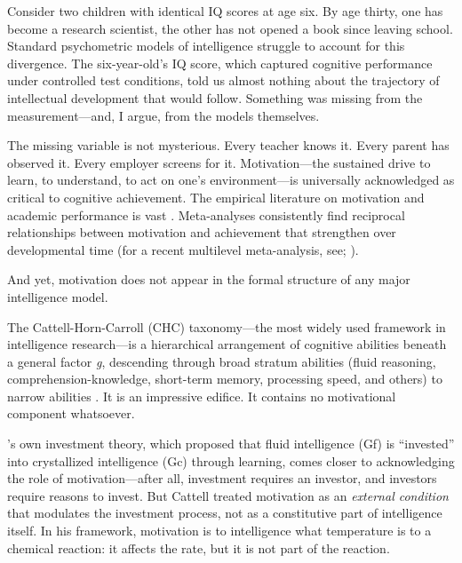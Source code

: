 \documentclass[12pt,a4paper]{article}
\begin{document}
Consider two children with identical IQ scores at age six. By age thirty, one has become a research scientist, the other has not opened a book since leaving school. Standard psychometric models of intelligence struggle to account for this divergence. The six-year-old's IQ score, which captured cognitive performance under controlled test conditions, told us almost nothing about the trajectory of intellectual development that would follow. Something was missing from the measurement---\hspace{0pt}and, I argue, from the models themselves.

The missing variable is not mysterious. Every teacher knows it. Every parent has observed it. Every employer screens for it. Motivation---\hspace{0pt}the sustained drive to learn, to understand, to act on one's environment---\hspace{0pt}is universally acknowledged as critical to cognitive achievement. The empirical literature on motivation and academic performance is vast \citep{DeciRyan2000,Dweck2006,WigfieldEccles2000}. Meta-analyses consistently find reciprocal relationships between motivation and achievement that strengthen over developmental time (for a recent multilevel meta-analysis, see; \citealp{Huang2024}).

And yet, motivation does not appear in the formal structure of any major intelligence model.

The Cattell-Horn-Carroll (CHC) taxonomy---\hspace{0pt}the most widely used framework in intelligence research---\hspace{0pt}is a hierarchical arrangement of cognitive abilities beneath a general factor \emph{g}, descending through broad stratum abilities (fluid reasoning, comprehension-knowledge, short-term memory, processing speed, and others) to narrow abilities \citep{McGrew2009,SchneiderMcGrew2018}. It is an impressive edifice. It contains no motivational component whatsoever.

\citeauthor{Cattell1971}'s \citeyearpar{Cattell1971} own investment theory, which proposed that fluid intelligence (Gf) is ``invested'' into crystallized intelligence (Gc) through learning, comes closer to acknowledging the role of motivation---\hspace{0pt}after all, investment requires an investor, and investors require reasons to invest. But Cattell treated motivation as an \emph{external condition} that modulates the investment process, not as a constitutive part of intelligence itself. In his framework, motivation is to intelligence what temperature is to a chemical reaction: it affects the rate, but it is not part of the reaction.
\end{document}
